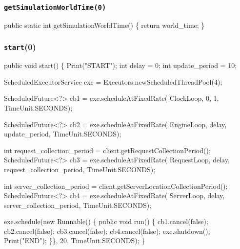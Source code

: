 \documentclass{article}
\def\nwendcode{\endtrivlist \endgroup}
\let\nwdocspar=\par
\begin{document}
\subsubsection{{\tt{}\protect{}getSimulationWorldTime(0)}}
\nwenddocs{}\endmoddef{}
public static int getSimulationWorldTime() \{
  return world_time;
\}
\eatline
{}\nwendcode{}\nwdocspar
\subsubsection{{\tt{}\protect{}start}(0)}
\nwenddocs{}\endmoddef{}
public void start() \{
  Print("START");
  int delay = 0;
  int update_period = 10;

  ScheduledExecutorService exe = Executors.newScheduledThreadPool(4);

  ScheduledFuture<?> cb1 = exe.scheduleAtFixedRate(
    ClockLoop, 0, 1, TimeUnit.SECONDS);

  ScheduledFuture<?> cb2 = exe.scheduleAtFixedRate(
    EngineLoop, delay, update_period, TimeUnit.SECONDS);

  int request_collection_period = client.getRequestCollectionPeriod();
  ScheduledFuture<?> cb3 = exe.scheduleAtFixedRate(
    RequestLoop, delay, request_collection_period, TimeUnit.SECONDS);

  int server_collection_period = client.getServerLocationCollectionPeriod();
  ScheduledFuture<?> cb4 = exe.scheduleAtFixedRate(
    ServerLoop, delay, server_collection_period, TimeUnit.SECONDS);

  exe.schedule(new Runnable() \{
    public void run() \{
      cb1.cancel(false);
      cb2.cancel(false);
      cb3.cancel(false);
      cb4.cancel(false);
      exe.shutdown();
      Print("END");
    \}\}, 20, TimeUnit.SECONDS);
\}
\eatline
{}\nwendcode{}\nwdocspar
\end{document}
